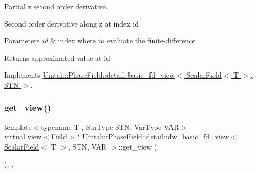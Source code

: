 Partial z second order derivative. 

Second order derivative along z at index id


\begin{DoxyParams}{Parameters}
{\em id} & index where to evaluate the finite-\/difference \\
\hline
\end{DoxyParams}
\begin{DoxyReturn}{Returns}
approximated value at id 
\end{DoxyReturn}


Implements \hyperlink{classUintah_1_1PhaseField_1_1detail_1_1basic__fd__view_3_01ScalarField_3_01T_01_4_00_01STN_01_4_a6a9141dd1b9b547eba1bd7ff0440b6bf}{Uintah\+::\+Phase\+Field\+::detail\+::basic\+\_\+fd\+\_\+view$<$ Scalar\+Field$<$ T $>$, S\+T\+N $>$}.

\mbox{\label{classUintah_1_1PhaseField_1_1detail_1_1dw__basic__fd__view_3_01ScalarField_3_01T_01_4_00_01STN_00_01VAR_01_4_ada3c79dde199711c630431fad25fbc2e}} 
\subsubsection{\texorpdfstring{get\+\_\+view()}{get\_view()}\hspace{0.1cm}{\footnotesize\ttfamily [1/2]}}
{\footnotesize\ttfamily template$<$typename T , Stn\+Type S\+TN, Var\+Type V\+AR$>$ \\
virtual \hyperlink{classUintah_1_1PhaseField_1_1detail_1_1view}{view}$<$\hyperlink{structUintah_1_1PhaseField_1_1ScalarField}{Field}$>$$\ast$ \hyperlink{classUintah_1_1PhaseField_1_1detail_1_1dw__basic__fd__view}{Uintah\+::\+Phase\+Field\+::detail\+::dw\+\_\+basic\+\_\+fd\+\_\+view}$<$ \hyperlink{structUintah_1_1PhaseField_1_1ScalarField}{Scalar\+Field}$<$ T $>$, S\+TN, V\+AR $>$\+::get\+\_\+view (\begin{DoxyParamCaption}{ }\end{DoxyParamCaption})\hspace{0.3cm}{\ttfamily [inline]}, {\ttfamily [override]}, {\ttfamily [virtual]}}



